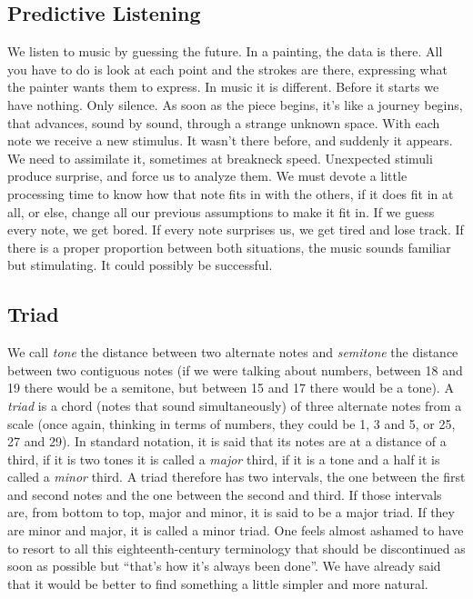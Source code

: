 \documentclass[]{report}
\begin{document}
\subsection{Predictive Listening}
We listen to music by guessing the future. In a painting, the data is there. All you have to do is look at each point and the strokes are there, expressing what the painter wants them to express. In music it is different. Before it starts we have nothing. Only silence. As soon as the piece begins, it's like a journey begins, that advances, sound by sound, through a strange unknown space.
With each note we receive a new stimulus. It wasn't there before, and suddenly it appears. We need to assimilate it, sometimes at breakneck speed.
Unexpected stimuli produce surprise, and force us to analyze them. We must devote a little processing time to know how that note fits in with the others, if it does fit in at all, or else, change all our previous assumptions to make it fit in. If we guess every note, we get bored. If every note surprises us, we get tired and lose track. If there is a proper proportion between both situations, the music sounds familiar but stimulating. It could possibly be successful.
\subsection{Triad}
We call \emph{tone} the distance between two alternate notes and \emph{semitone} the distance between two contiguous notes (if we were talking about numbers, between 18 and 19 there would be a semitone, but between 15 and 17 there would be a tone).
A \emph{triad} is a chord (notes that sound simultaneously) of three alternate notes from a scale (once again, thinking in terms of numbers, they could be 1, 3 and 5, or 25, 27 and 29). In standard notation, it is said that its notes are at a distance of a third, if it is two tones it is called a \emph{major} third, if it is a tone and a half it is called a \emph{minor} third. A triad therefore has two intervals, the one between the first and second notes and the one between the second and third. If those intervals are, from bottom to top, major and minor, it is said to be a major triad. If they are minor and major, it is called a minor triad.
One feels almost ashamed to have to resort to all this eighteenth-century terminology that should be discontinued as soon as possible but ``that's how it's always been done''. We have already said that it would be better to find something a little simpler and more natural.
\end{document}

